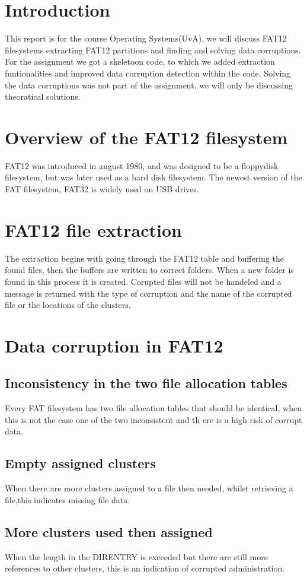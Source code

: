 \documentclass[pdftex,12pt,a4paper]{article}
\begin{document}
\section{Introduction}
This report is for the course Operating Systems(UvA), we will discuss FAT12 filesystems extracting FAT12 partitions and finding and solving data corruptions. For the assignment we got a skeletoon code, to which we added extraction funtionalities and improved data corruption detection within the code. Solving the data corruptions was not part of the assignment, we will only be discussing theoratical solutions.
\section{Overview of the FAT12 filesystem}
FAT12 was introduced in august 1980, and was designed to be a floppydisk filesystem, but was later used as a hard disk filesystem. The newest version of the FAT filesystem, FAT32 is widely used on USB drives.
\section{FAT12 file extraction}
The extraction begins with going through the FAT12 table and buffering the found files, then the buffers are written to correct folders. When a new folder is found in this process it is created. Corupted files will not be handeled and a message is returned with the type of corruption and the name of the corrupted file or the locations of the clusters.
\section{Data corruption in FAT12}
\subsection{Inconsistency in the two file allocation tables}
Every FAT filesystem has two file allocation tables that should be identical, when this is not the case one of the two inconsistent and th
ere is a high risk of corrupt data.
\subsection{Empty assigned clusters}
When there are more clusters assigned to a file then needed, whilst retrieving a file,this indicates missing file data. 
\subsection{More clusters used then assigned}
When the length in the DIRENTRY is exceeded but there are still more references to other clusters, this is an indication of corrupted administration.
\end{document}
